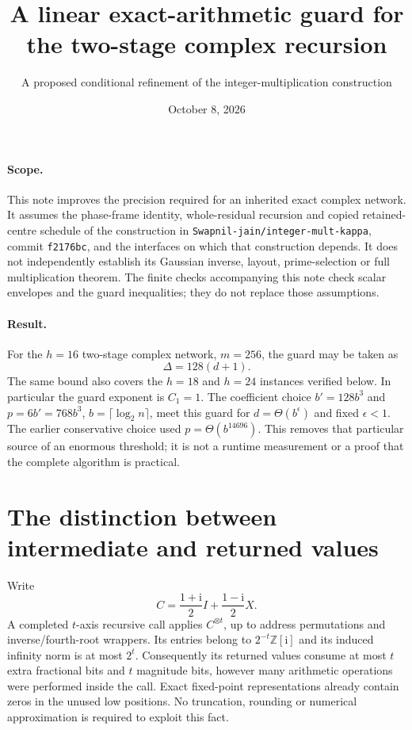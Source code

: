 \documentclass[11pt]{article}
\title{A linear exact-arithmetic guard for the two-stage complex recursion}
\author{A proposed conditional refinement of the integer-multiplication construction}
\date{October 8, 2026}
\newcommand{\ii}{\mathrm i}
\newcommand{\Z}{\mathbb Z}
\begin{document}
\maketitle

\paragraph{Scope.}
This note improves the precision required for an inherited exact complex network.
It assumes the phase-frame identity, whole-residual recursion and copied
retained-centre schedule of the construction in
\texttt{Swapnil-jain/integer-mult-kappa}, commit
\texttt{f2176bc}, and the interfaces on which that construction depends.
It does not independently establish its Gaussian inverse, layout, prime-selection
or full multiplication theorem. The finite checks accompanying this note check
scalar envelopes and the guard inequalities; they do not replace those assumptions.

\paragraph{Result.}
For the $h=16$ two-stage complex network, $m=256$, the guard may be taken as
\[
                 \boxed{\Delta=128(d+1).}
\]
The same bound also covers the $h=18$ and $h=24$ instances verified below.
In particular the guard exponent is $C_1=1$. The coefficient choice
$b'=128b^3$ and $p=6b'=768b^3$, $b=\lceil\log_2 n\rceil$, meet this guard for
$d=\Theta(b^\epsilon)$ and fixed $\epsilon<1$.
The earlier conservative choice used $p=\Theta(b^{14696})$.
This removes that particular source of an enormous threshold; it is not a
runtime measurement or a proof that the complete algorithm is practical.

\section{The distinction between intermediate and returned values}
Write
\[
 C=\frac{1+\ii}{2}I+\frac{1-\ii}{2}X.
\]
A completed $t$-axis recursive call applies $C^{\otimes t}$, up to address
permutations and inverse/fourth-root wrappers. Its entries belong to
$2^{-t}\Z[\ii]$ and its induced infinity norm is at most $2^t$.
Consequently its returned values consume at most $t$ extra fractional bits
and $t$ magnitude bits, however many arithmetic operations were performed
inside the call. Exact fixed-point representations already contain zeros in
the unused low positions. No truncation, rounding or numerical approximation
is required to exploit this fact.
\end{document}
